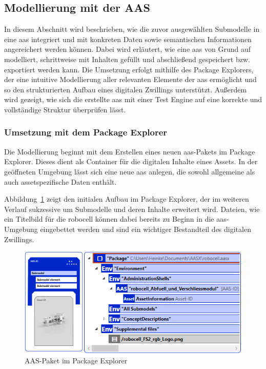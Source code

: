\subsection{Modellierung mit der AAS}
In diesem Abschnitt wird beschrieben, wie die zuvor ausgewählten Submodelle in eine \acs{aas} integriert und mit konkreten Daten sowie semantischen Informationen angereichert werden können.
Dabei wird erläutert, wie eine \acs{aas} von Grund auf modelliert, schrittweise mit Inhalten gefüllt und abschließend gespeichert bzw. exportiert werden kann.  
Die Umsetzung erfolgt mithilfe des Package Explorers, der eine intuitive Modellierung aller relevanten Elemente der \acs{aas} ermöglicht und so den strukturierten Aufbau eines digitalen Zwillings unterstützt.
Außerdem wird gezeigt, wie sich die erstellte \acs{aas} mit einer Test Engine auf eine korrekte und vollständige Struktur überprüfen lässt.

\subsubsection{Umsetzung mit dem Package Explorer}

Die Modellierung beginnt mit dem Erstellen eines neuen \acs{aas}-Pakets im Package Explorer.
Dieses dient als Container für die digitalen Inhalte eines Assets.  
In der geöffneten Umgebung lässt sich eine neue \acs{aas} anlegen, die sowohl allgemeine als auch assetspezifische Daten enthält. 

Abbildung~\ref{fig:NeuesAASPaket} zeigt den initialen Aufbau im Package Explorer, der im weiteren Verlauf sukzessive um Submodelle und deren Inhalte erweitert wird.
Dateien, wie ein Titelbild für die robocell können dabei bereits zu Beginn in die \acs{aas}-Umgebung eingebettet werden und sind ein wichtiger Bestandteil des digitalen Zwillings.

\begin{figure}[htbp]
    \centering
    \includegraphics{Bilder/ModellierungAAS/Final/NeuesAASPaket.PNG}
    \caption{AAS-Paket im Package Explorer}
    \label{fig:NeuesAASPaket}
\end{figure}

